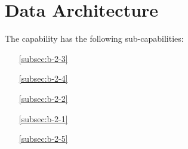 \chapter{Data Architecture}\label{subsec:ekgmm-b-2} %

The \currentname capability has the following sub-capabilities:

\begin{itemize}[leftmargin=.5in]
  \item [\ref{subsec:b-2-3}] 
  \item [\ref{subsec:b-2-4}] 
  \item [\ref{subsec:b-2-2}] 
  \item [\ref{subsec:b-2-1}] 
  \item [\ref{subsec:b-2-5}] 
\end{itemize}








